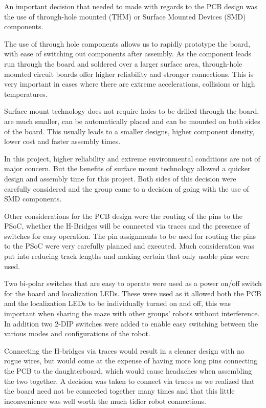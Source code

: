 \documentclass{article}
\begin{document}
An important decision that needed to made with regards to the PCB design was the use of through-hole mounted (THM) or Surface Mounted Devices (SMD) components.

The use of through hole components allows us to rapidly prototype the board, with ease of switching out components after assembly. As the component leads run through the board and soldered over a larger surface area, through-hole mounted circuit boards offer higher reliability and stronger connections. This is very important in cases where there are extreme accelerations, collisions or high temperatures.

Surface mount technology does not require holes to be drilled through the board, are much smaller, can be automatically placed and can be mounted on both sides of the board. This usually leads to a smaller designs, higher component density, lower cost and faster assembly times. 

In this project, higher reliability and extreme environmental conditions are not of major concern. But the benefits of surface mount technology allowed a quicker design and assembly time for this project. Both sides of this decision were carefully considered and the group came to a decision of going with the use of SMD components.

Other considerations for the PCB design were the routing of the pins to the PSoC, whether the H-Bridges will be connected via traces and the presence of switches for easy operation. The pin assignments to be used for routing the pins to the PSoC were very carefully planned and executed. Much consideration was put into reducing track lengths and making certain that only usable pins were used.

Two bi-polar switches that are easy to operate were used as a power on/off switch for the board and localization LEDs. These were used as it allowed both the PCB and the localization LEDs to be individually turned on and off, this was important when sharing the maze with other groups' robots without interference. In addition two 2-DIP switches were added to enable easy switching between the various modes and configurations of the robot.

Connecting the H-bridges via traces would result in a cleaner design with no rogue wires, but would come at the expense of having more long pins connecting the PCB to the daughterboard, which would cause headaches when assembling the two together. A decision was taken to connect via traces as we realized that the board need not be connected together many times and that this little inconvenience was well worth the much tidier robot connections.
\end{document}
